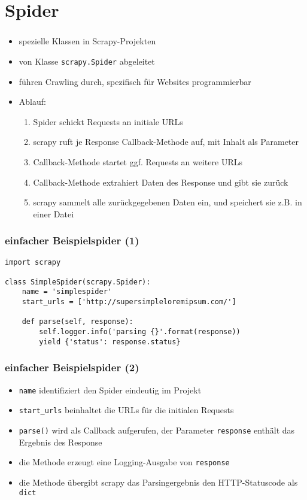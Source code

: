 \documentclass{beamer}
\begin{document}
\section{Spider}
\begin{frame}[fragile]
	\frametitle{\insertsection}
	\begin{itemize}
		\item spezielle Klassen in Scrapy-Projekten
		\item von Klasse \verb|scrapy.Spider| abgeleitet
		\item führen Crawling durch, spezifisch für Websites programmierbar
		\item Ablauf: \begin{enumerate}		
			\item Spider schickt Requests an initiale URLs
			\item scrapy ruft je Response Callback-Methode auf, mit Inhalt als Parameter
			\item Callback-Methode startet ggf. Requests an weitere URLs
			\item Callback-Methode extrahiert Daten des Response und gibt sie zurück
			\item scrapy sammelt alle zurückgegebenen Daten ein, und speichert sie z.B. in einer Datei
		\end{enumerate}
	\end{itemize}
\end{frame}
\begin{frame}[fragile]
	\frametitle{einfacher Beispielspider (1)}
			\begin{lstlisting}
import scrapy

class SimpleSpider(scrapy.Spider):
    name = 'simplespider'
    start_urls = ['http://supersimpleloremipsum.com/']

    def parse(self, response):
        self.logger.info('parsing {}'.format(response))
        yield {'status': response.status}
			\end{lstlisting}
\end{frame}
\begin{frame}[fragile]
	\frametitle{einfacher Beispielspider (2)}
	\begin{itemize}
		\item \lstinline|name| identifiziert den Spider eindeutig im Projekt
		\item \lstinline|start_urls| beinhaltet die URLs für die initialen Requests
		\item \lstinline|parse()| wird als Callback aufgerufen, der Parameter \lstinline|response| enthält das Ergebnis des Response
		\item die Methode erzeugt eine Logging-Ausgabe von \lstinline|response| 
		\item die Methode übergibt scrapy das Parsingergebnis den HTTP-Statuscode als \lstinline|dict|
	\end{itemize}
\end{frame}
\end{document}
